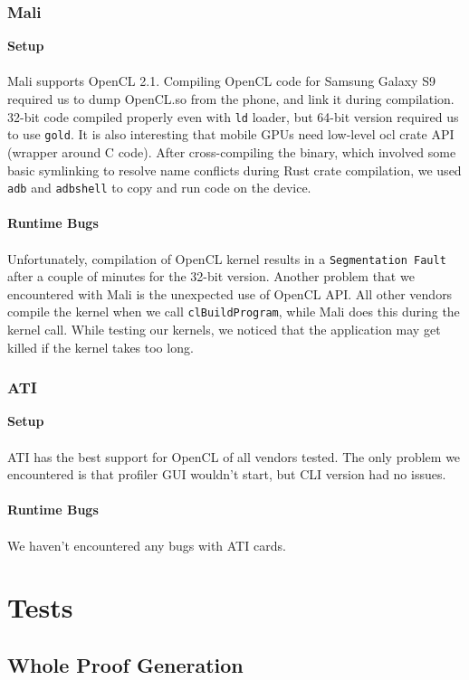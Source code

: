 \subsubsection{Mali}
\textbf{Setup}\\\\
Mali supports OpenCL 2.1. Compiling OpenCL code for Samsung Galaxy S9 required us to dump OpenCL.so from the phone, and link it during compilation. 32-bit code compiled properly even with \texttt{ld} loader, but 64-bit version required us to use \texttt{gold}. It is also interesting that mobile GPUs need low-level ocl crate API (wrapper around C code). After cross-compiling the binary, which involved some basic symlinking to resolve name conflicts during Rust crate compilation, we used \texttt{adb} and \texttt{adbshell} to copy and run code on the device.\\\\
\textbf{Runtime Bugs}\\\\
Unfortunately, compilation of OpenCL kernel results in a \texttt{Segmentation Fault} after a couple of minutes for the 32-bit version. Another problem that we encountered with Mali is the unexpected use of OpenCL API. All other vendors compile the kernel when we call \texttt{clBuildProgram}, while Mali does this during the kernel call. While testing our kernels, we noticed that the application may get killed if the kernel takes too long.

\subsubsection{ATI}
\textbf{Setup}\\\\
ATI has the best support for OpenCL of all vendors tested. The only problem we encountered is that profiler GUI wouldn't start, but CLI version had no issues.\\\\
\textbf{Runtime Bugs}\\\\
We haven't encountered any bugs with ATI cards.

\section{Tests}

\subsection{Whole Proof Generation}

